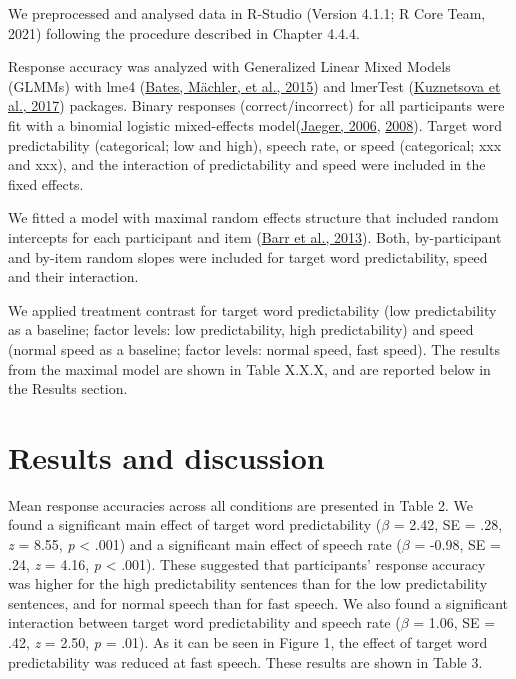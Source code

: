 \documentclass[a4paper, nobind]{templates/ociamthesis}
\begin{document}
We preprocessed and analysed data in R-Studio (Version 4.1.1; R Core Team, 2021) following the procedure described in Chapter 4.4.4.

Response accuracy was analyzed with Generalized Linear Mixed Models (GLMMs) with lme4 (\protect\hyperlink{ref-Bates2015}{Bates, Mächler, et al., 2015}) and lmerTest (\protect\hyperlink{ref-Kuznetsova2017}{Kuznetsova et al., 2017}) packages.
Binary responses (correct/incorrect) for all participants were fit with a binomial logistic mixed-effects model(\protect\hyperlink{ref-Jaeger2006}{Jaeger, 2006}, \protect\hyperlink{ref-Jaeger2008}{2008}).
Target word predictability (categorical; low and high), speech rate, or speed (categorical; xxx and xxx), and the interaction of predictability and speed were included in the fixed effects.

We fitted a model with maximal random effects structure that included random intercepts for each participant and item (\protect\hyperlink{ref-Barr2013}{Barr et al., 2013}).
Both, by-participant and by-item random slopes were included for target word predictability, speed and their interaction.

We applied treatment contrast for target word predictability (low predictability as a baseline; factor levels: low predictability, high predictability) and speed (normal speed as a baseline; factor levels: normal speed, fast speed).
The results from the maximal model are shown in Table X.X.X, and are reported below in the Results section.

\hypertarget{results-and-discussion-3}{%
\section{Results and discussion}\label{results-and-discussion-3}}

Mean response accuracies across all conditions are presented in Table 2.
We found a significant main effect of target word predictability (\(\beta\) = 2.42, SE = .28, \emph{z} = 8.55, \emph{p} \textless{} .001) and a significant main effect of speech rate (\(\beta\) = -0.98, SE = .24, \emph{z} = 4.16, \emph{p} \textless{} .001).
These suggested that participants' response accuracy was higher for the high predictability sentences than for the low predictability sentences, and for normal speech than for fast speech.
We also found a significant interaction between target word predictability and speech rate (\(\beta\) = 1.06, SE = .42, \emph{z} = 2.50, \emph{p} = .01). As it can be seen in Figure 1, the effect of target word predictability was reduced at fast speech. These results are shown in Table 3.
\end{document}
